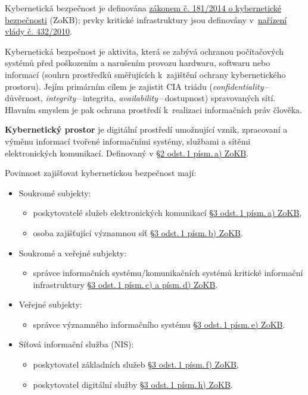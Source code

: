 Kybernetická bezpečnost je definována \href{https://www.zakonyprolidi.cz/cs/2014-181}{zákonem č. 181/2014 o kybernetické bezpečnosti} (ZoKB); prvky kritické infrastruktury jsou definovány v~\href{https://www.zakonyprolidi.cz/cs/2010-432}{nařízení vlády č. 432/2010}.

Kybernetická bezpečnost je aktivita, která se zabývá ochranou počítačových systémů před poškozením a narušením provozu hardwaru, softwaru nebo informací (souhrn prostředků směřujících k~zajištění ochrany kybernetického prostoru). Jejím primárním cílem je zajistit CIA triádu (\emph{confidentiality}\,--\,důvěrnost, \emph{integrity}\,--\,integrita, \emph{availability}\,--\,dostupnost) spravovaných sítí. Hlavním smyslem je pak ochrana prostředí k~realizaci informačních práv člověka.

\textbf{Kybernetický prostor} je digitální prostředí umožnující vznik, zpracovaní a výměnu informací tvořené informačními systémy, službami a sítěmi elektronických komunikací. Definovaný v  \href{https://www.zakonyprolidi.cz/cs/2014-181#p2-1-a}{§2 odst.\,1 písm.\,a) ZoKB}.

Povinnost zajišťovat kybernetickou bezpečnost mají:
\begin{itemize}
    \item Soukromé subjekty:
    \begin{itemize}
        \item poskytovatelé služeb elektronických komunikací \href{https://www.zakonyprolidi.cz/cs/2014-181#p3-1-a}{§3 odst.\,1 písm.\,a) ZoKB},
        \item osoba zajišťující významnou síť \href{https://www.zakonyprolidi.cz/cs/2014-181#p3-1-b}{§3 odst.\,1 písm.\,b) ZoKB}.
    \end{itemize}
    \item Soukromé a veřejné subjekty:
    \begin{itemize}
        \item správce informačních systému/komunikačních systémů kritické informační infrastruktury \href{https://www.zakonyprolidi.cz/cs/2014-181#p3-1-c}{§3 odst.\,1 písm.\,c) a písm.\,d) ZoKB}.
    \end{itemize}
    \item Veřejné subjekty:
    \begin{itemize}
        \item správce významného informačního systému \href{https://www.zakonyprolidi.cz/cs/2014-181#p3-1-e}{§3 odst.\,1 písm.\,e) ZoKB}.
    \end{itemize}
    \item Síťová informační služba (NIS):
    \begin{itemize}
        \item poskytovatel základních služeb \href{https://www.zakonyprolidi.cz/cs/2014-181#p3-1-f}{§3 odst.\,1 písm.\,f) ZoKB},
        \item poskytovatel digitální služby \href{https://www.zakonyprolidi.cz/cs/2014-181#p3-1-h}{§3 odst.\,1 písm.\,h) ZoKB}.
    \end{itemize}
\end{itemize}

